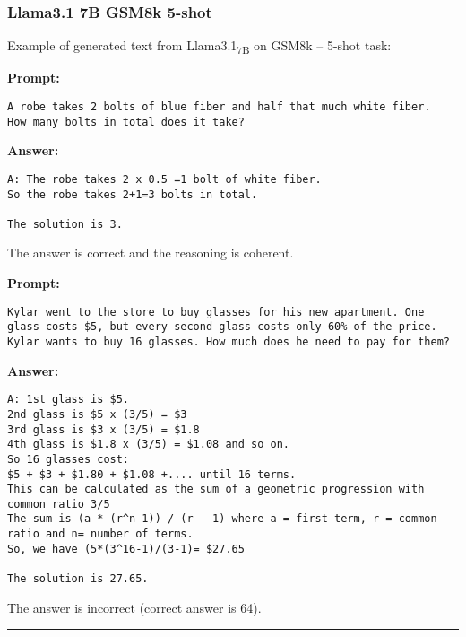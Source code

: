 	\subsubsection*{Llama3.1 7B GSM8k 5-shot}
	\noindent Example of generated text from Llama3.1\textsubscript{7B} on GSM8k -- 5-shot task:
	\begin{displayquote}
		\textbf{Prompt:}
		\begin{Verbatim}[fontsize=\small,breaklines]
A robe takes 2 bolts of blue fiber and half that much white fiber.  How many bolts in total does it take?
	\end{Verbatim}
		\textbf{Answer:}
		\begin{Verbatim}[fontsize=\small,breaklines]
A: The robe takes 2 x 0.5 =1 bolt of white fiber.
So the robe takes 2+1=3 bolts in total.

The solution is 3.
	\end{Verbatim}
	\end{displayquote}
	The answer is correct and the reasoning is coherent.
	\begin{displayquote}
		\textbf{Prompt:}
		\begin{Verbatim}[fontsize=\small,breaklines]
Kylar went to the store to buy glasses for his new apartment. One glass costs $5, but every second glass costs only 60% of the price. Kylar wants to buy 16 glasses. How much does he need to pay for them?
	\end{Verbatim}
		\textbf{Answer:}
		\begin{Verbatim}[fontsize=\small,breaklines]
A: 1st glass is $5.
2nd glass is $5 x (3/5) = $3
3rd glass is $3 x (3/5) = $1.8
4th glass is $1.8 x (3/5) = $1.08 and so on.
So 16 glasses cost:
$5 + $3 + $1.80 + $1.08 +.... until 16 terms.
This can be calculated as the sum of a geometric progression with common ratio 3/5
The sum is (a * (r^n-1)) / (r - 1) where a = first term, r = common ratio and n= number of terms.
So, we have (5*(3^16-1)/(3-1)= $27.65

The solution is 27.65.
	\end{Verbatim}
	\end{displayquote}
	The answer is incorrect (correct answer is 64).

	\noindent\rule{\textwidth}{0.4pt}

